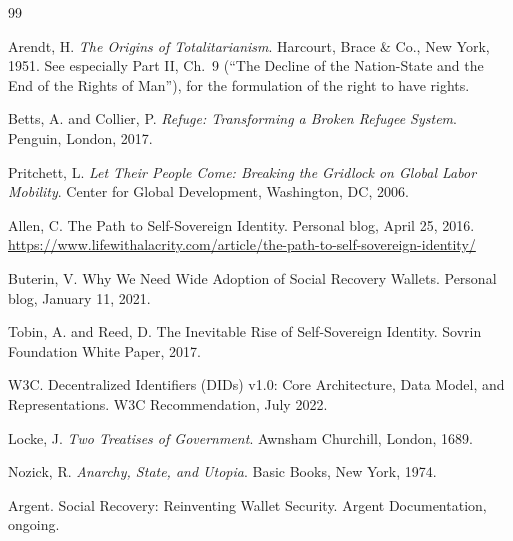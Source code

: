 \documentclass[11pt,a4paper]{article}
\theoremstyle{remark}
\begin{document}

\begin{thebibliography}{99}

Arendt, H.
\newblock \emph{The Origins of Totalitarianism}.
\newblock Harcourt, Brace \& Co., New York, 1951.
\newblock See especially Part II, Ch.~9 (``The Decline of the
  Nation-State and the End of the Rights of Man''), for the
  formulation of the right to have rights.

Betts, A. and Collier, P.
\newblock \emph{Refuge: Transforming a Broken Refugee System}.
\newblock Penguin, London, 2017.

Pritchett, L.
\newblock \emph{Let Their People Come: Breaking the Gridlock on
  Global Labor Mobility}.
\newblock Center for Global Development, Washington, DC, 2006.

Allen, C.
\newblock The Path to Self-Sovereign Identity.
\newblock Personal blog, April 25, 2016.
\newblock \url{https://www.lifewithalacrity.com/article/the-path-to-self-sovereign-identity/}

Buterin, V.
\newblock Why We Need Wide Adoption of Social Recovery Wallets.
\newblock Personal blog, January 11, 2021.

Tobin, A. and Reed, D.
\newblock The Inevitable Rise of Self-Sovereign Identity.
\newblock Sovrin Foundation White Paper, 2017.

W3C.
\newblock Decentralized Identifiers (DIDs) v1.0: Core Architecture,
  Data Model, and Representations.
\newblock W3C Recommendation, July 2022.

Locke, J.
\newblock \emph{Two Treatises of Government}.
\newblock Awnsham Churchill, London, 1689.

Nozick, R.
\newblock \emph{Anarchy, State, and Utopia}.
\newblock Basic Books, New York, 1974.

Argent.
\newblock Social Recovery: Reinventing Wallet Security.
\newblock Argent Documentation, ongoing.


\end{thebibliography}
\end{document}
